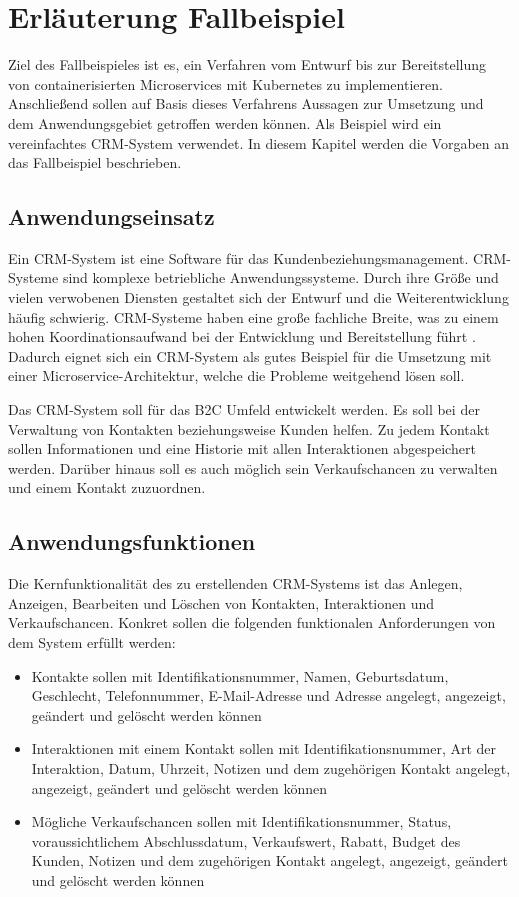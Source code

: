 \section{Erläuterung Fallbeispiel}
Ziel des Fallbeispieles ist es, ein Verfahren vom Entwurf bis zur Bereitstellung von containerisierten Microservices mit Kubernetes zu implementieren. Anschließend sollen auf Basis dieses Verfahrens Aussagen zur Umsetzung und dem Anwendungsgebiet getroffen werden können. Als Beispiel wird ein vereinfachtes \ac{CRM}-System verwendet. In diesem Kapitel werden die Vorgaben an das Fallbeispiel beschrieben.

\subsection{Anwendungseinsatz}
Ein \ac{CRM}-System ist eine Software für das Kundenbeziehungsmanagement. CRM-Systeme sind komplexe betriebliche Anwendungssysteme. Durch ihre Größe und vielen verwobenen Diensten gestaltet sich der Entwurf und die Weiterentwicklung häufig schwierig. \ac{CRM}-Systeme haben eine große fachliche Breite, was zu einem hohen Koordinationsaufwand bei der Entwicklung und Bereitstellung führt \parencite[vgl.][S. 62]{trempArchitekturen2021}. Dadurch eignet sich ein \ac{CRM}-System als gutes Beispiel für die Umsetzung mit einer Microservice-Architektur, welche die Probleme weitgehend lösen soll. 

Das \ac{CRM}-System soll für das \ac{B2C} Umfeld entwickelt werden. Es soll bei der Verwaltung von Kontakten beziehungsweise Kunden helfen. Zu jedem Kontakt sollen Informationen und eine Historie mit allen Interaktionen abgespeichert werden. Darüber hinaus soll es auch möglich sein Verkaufschancen zu verwalten und einem Kontakt zuzuordnen.

\subsection{Anwendungsfunktionen}
Die Kernfunktionalität des zu erstellenden \ac{CRM}-Systems ist das Anlegen, Anzeigen, Bearbeiten und Löschen von Kontakten, Interaktionen und Verkaufschancen. Konkret sollen die folgenden funktionalen Anforderungen von dem System erfüllt werden:
\begin{itemize}
\item Kontakte sollen mit Identifikationsnummer, Namen, Geburtsdatum, Geschlecht, Telefonnummer, E-Mail-Adresse und Adresse angelegt, angezeigt, geändert und gelöscht werden können
\item Interaktionen mit einem Kontakt sollen mit Identifikationsnummer, Art der Interaktion, Datum, Uhrzeit, Notizen und dem zugehörigen Kontakt angelegt, angezeigt, geändert und gelöscht werden können
\item Mögliche Verkaufschancen sollen mit Identifikationsnummer, Status, voraussichtlichem Abschlussdatum, Verkaufswert, Rabatt, Budget des Kunden, Notizen und dem zugehörigen Kontakt angelegt, angezeigt, geändert und gelöscht werden können
\end{itemize} 

